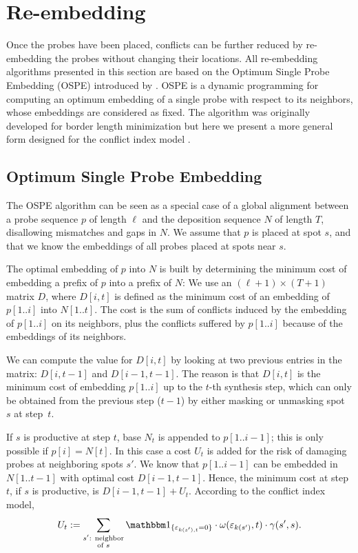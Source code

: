 \chapter{Re-embedding}
\label{ch:reembed}

Once the probes have been placed, conflicts can be further reduced by
re-embedding the probes without changing their locations. All
re-embedding algorithms presented in this section are based on the
Optimum Single Probe Embedding (OSPE) introduced by \citet{Kahng2002}.
OSPE is a dynamic programming for computing an optimum embedding of a
single probe with respect to its neighbors, whose embeddings are
considered as fixed. The algorithm was originally developed for border
length minimization but here we present a more general form designed
for the conflict index model \citep{Carvalho2006}.

\section{Optimum Single Probe Embedding}
\label{sec:reembed_ospe}

The OSPE algorithm can be seen as a special case of a global alignment
between a probe sequence $p$ of length $\ell$ and the deposition
sequence $N$ of length $T$, disallowing mismatches and gaps in $N$.
We assume that $p$ is placed at spot $s$, and that we know the
embeddings of all probes placed at spots near $s$.

The optimal embedding of $p$ into $N$ is built by determining the
minimum cost of embedding a prefix of $p$ into a prefix of $N$: We use
an $(\ell + 1) \times (T + 1)$ matrix $D$, where $D[i,t]$ is defined
as the minimum cost of an embedding of $p[1..i]$ into $N[1..t]$. The
cost is the sum of conflicts induced by the embedding of $p[1..i]$ on
its neighbors, plus the conflicts suffered by $p[1..i]$ because of the
embeddings of its neighbors.

We can compute the value for $D[i,t]$ by looking at two previous
entries in the matrix: $D[i,t-1]$ and $D[i-1,t-1]$. The reason is that
$D[i,t]$ is the minimum cost of embedding $p[1..i]$ up to the
$t$-th synthesis step, which can only be obtained from the previous
step ($t-1$) by either masking or unmasking spot~$s$ at step~$t$.

If $s$ is productive at step $t$, base $N_t$ is appended to
$p[1..i-1]$; this is only possible if $p[i]=N[t]$. In this case a cost
$U_t$ is added for the risk of damaging probes at neighboring spots
$s'$. We know that $p[1..i-1]$ can be embedded in $N[1..t-1]$ with
optimal cost $D[i-1,t-1]$.  Hence, the minimum cost at step $t$, if
$s$ is productive, is $D[i-1,t-1] + U_t$.  According to the conflict
index model,
\[
U_t := \sum_{\substack{s'\text{: neighbor}\\\text{of } s}}
  \Ind{\eps_{k(s'),t}=0}
  \cdot \omega(\eps_{k(s')},t)
  \cdot \gamma(s',s).
\]



